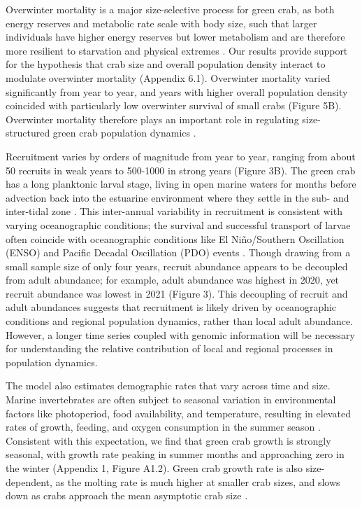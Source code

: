 \documentclass{article}
\begin{document}
Overwinter mortality is a major size-selective process for green crab, as both energy reserves and metabolic rate scale with body size, such that larger individuals have higher energy reserves but lower metabolism and are therefore more resilient to starvation and physical extremes \parencite{carlson2008seasonal, sogard1997size}. Our results provide support for the hypothesis that crab size and overall population density interact to modulate overwinter mortality (Appendix 6.1). Overwinter mortality varied significantly from year to year, and years with higher overall population density coincided with particularly low overwinter survival of small crabs (Figure 5B). Overwinter mortality therefore plays an important role in regulating size-structured green crab population dynamics \parencite{henderson1988size}. 

Recruitment varies by orders of magnitude from year to year, ranging from about 50 recruits in weak years to 500-1000 in strong years (Figure 3B). The green crab has a long planktonic larval stage, living in open marine waters for months before advection back into the estuarine environment where they settle in the sub- and inter-tidal zone \parencite{yamada2001global}. This inter-annual variability in recruitment is consistent with varying oceanographic conditions; the survival and successful transport of larvae often coincide with oceanographic conditions like El Niño/Southern Oscillation (ENSO) and Pacific Decadal Oscillation (PDO) events \parencite{yamada2021ocean}. Though drawing from a small sample size of only four years, recruit abundance appears to be decoupled from adult abundance; for example, adult abundance was highest in 2020, yet recruit abundance was lowest in 2021 (Figure 3). This decoupling of recruit and adult abundances suggests that recruitment is likely driven by oceanographic conditions and regional population dynamics, rather than local adult abundance. However, a longer time series coupled with genomic information will be necessary for understanding the relative contribution of local and regional processes in population dynamics.

The model also estimates demographic rates that vary across time and size. Marine invertebrates are often subject to seasonal variation in environmental factors like photoperiod, food availability, and temperature, resulting in elevated rates of growth, feeding, and oxygen consumption in the summer season \parencite{brockington2001relative}. Consistent with this expectation, we find that green crab growth is strongly seasonal, with growth rate peaking in summer months and approaching zero in the winter (Appendix 1, Figure A1.2). Green crab growth rate is also size-dependent, as the molting rate is much higher at smaller crab sizes, and slows down as crabs approach the mean asymptotic crab size \parencite{yamada2005growth}.
\end{document}
